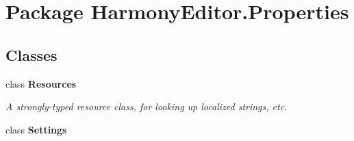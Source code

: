 \hypertarget{namespace_harmony_editor_1_1_properties}{\section{Package Harmony\+Editor.\+Properties}
\label{namespace_harmony_editor_1_1_properties}
}
\subsection*{Classes}
\begin{DoxyCompactItemize}
\item 
class {\bfseries Resources}
\begin{DoxyCompactList}\small\item\em A strongly-\/typed resource class, for looking up localized strings, etc. \end{DoxyCompactList}\item 
class {\bfseries Settings}
\end{DoxyCompactItemize}
